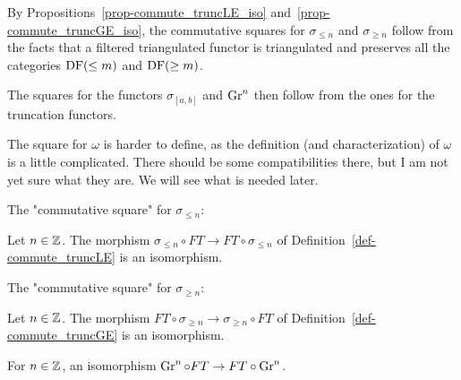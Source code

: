 By Propositions~\ref{prop-commute_truncLE_iso} and~\ref{prop-commute_truncGE_iso},
the commutative squares for $\sigma_{\le n}$ and
$\sigma_{\ge n}$ follow from the facts that a filtered triangulated functor is triangulated 
and preserves all the categories $\operatorname{DF}(\le m)$ and $\operatorname{DF}(\ge m)$.

The squares for the functors $\sigma_{[a,b]}$ and $\operatorname{Gr}^n$ then follow from the ones for
the truncation functors.

The square for $\omega$ is harder to define, as the definition (and characterization) 
of $\omega$ is a little complicated. There should be some compatibilities there, but I am 
not yet sure what they are. We will see what is needed later.

The "commutative square" for $\sigma_{\le n}$: 

\begin{proposition}
\label{prop-FT-truncLE}

Let $n\in\mathbb{Z}$. The morphism $\sigma_{\le n}\circ FT \to FT\circ\sigma_{\le n}$
of Definition~\ref{def-commute_truncLE} is an isomorphism.

\end{proposition}

The "commutative square" for $\sigma_{\ge n}$: 

\begin{proposition}
\label{prop-FT-truncGE}

Let $n\in\mathbb{Z}$. The morphism $FT\circ\sigma_{\ge n}\to\sigma_{\ge n}\circ FT$
of Definition~\ref{def-commute_truncGE} is an isomorphism.

\end{proposition}

\begin{definition}
\label{def-FT-Gr}

For $n\in\mathbb{Z}$, an isomorphism $\operatorname{Gr}^n\circ FT\to FT\circ\operatorname{Gr}^n$.

\end{definition}

